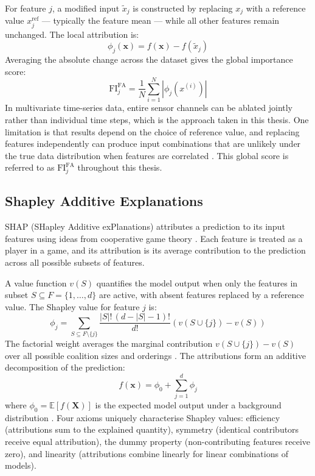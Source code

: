 For feature $j$, a modified input $\tilde{x}_j$ is constructed by replacing $x_j$ with a reference value $x^{\text{ref}}_j$ — typically the feature mean — while all other features remain unchanged. The local attribution is:
%
\begin{equation}
    \phi_j(\mathbf{x}) = f(\mathbf{x}) - f(\tilde{x}_j)
    \label{eq:fa_local}
\end{equation}
%
Averaging the absolute change across the dataset gives the global importance score:
%
\begin{equation}
    \text{FI}^{\text{FA}}_j = \frac{1}{N} \sum_{i=1}^{N} \left| \phi_j\!\left(x^{(i)}\right) \right|
    \label{eq:fa_global}
\end{equation}
%
In multivariate time-series data, entire sensor channels can be ablated jointly rather than individual time steps, which is the approach taken in this thesis. One limitation is that results depend on the choice of reference value, and replacing features independently can produce input combinations that are unlikely under the true data distribution when features are correlated \citep{molnar2023}. This global score is referred to as $\text{FI}^{\text{FA}}_j$ throughout this thesis.

\subsection{Shapley Additive Explanations}

SHAP (SHapley Additive exPlanations) attributes a prediction to its input features using ideas from cooperative game theory \citep{lundberg2017unified, Shapley1953}. Each feature is treated as a player in a game, and its attribution is its average contribution to the prediction across all possible subsets of features.

A value function $v(S)$ quantifies the model output when only the features in subset $S \subseteq F = \{1, \ldots, d\}$ are active, with absent features replaced by a reference value. The Shapley value for feature $j$ is:
%
\begin{equation}
    \phi_j = \sum_{S \subseteq F \setminus \{j\}} \frac{|S|!\,(d - |S| - 1)!}{d!} \left(v(S \cup \{j\}) - v(S)\right)
    \label{eq:shapley}
\end{equation}
%
The factorial weight averages the marginal contribution $v(S \cup \{j\}) - v(S)$ over all possible coalition sizes and orderings \citep{Shapley1953}. The attributions form an additive decomposition of the prediction:
%
\begin{equation}
    f(\mathbf{x}) = \phi_0 + \sum_{j=1}^{d} \phi_j
    \label{eq:shap_decomp}
\end{equation}
%
where $\phi_0 = \mathbb{E}[f(\mathbf{X})]$ is the expected model output under a background distribution \citep{lundberg2017unified}. Four axioms uniquely characterise Shapley values: efficiency (attributions sum to the explained quantity), symmetry (identical contributors receive equal attribution), the dummy property (non-contributing features receive zero), and linearity (attributions combine linearly for linear combinations of models).

